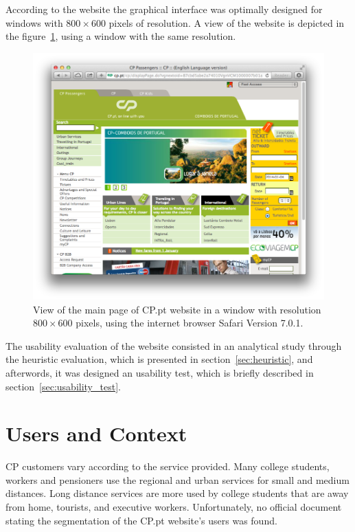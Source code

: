 \documentclass[a4paper]{article}
\begin{document}
According to the website the graphical interface was optimally designed for windows with $800\times 600$ pixels of resolution. A view of the website is depicted in the figure~\ref{fig:cp_home}, using a window with the same resolution. 

\begin{figure}[h] 
	\centering
	\includegraphics[width=\textwidth]{figures/cp_home}
 	\caption{View of the main page of CP.pt website in a window with resolution $800\times 600$ pixels, using the internet browser Safari Version 7.0.1.}\label{fig:cp_home}
\end{figure}

The usability evaluation of the website consisted in an analytical study through the heuristic evaluation, which is presented in section~\ref{sec:heuristic}, and afterwords, it was designed an usability test, which is briefly described in section~\ref{sec:usability_test}.

\section{Users and Context}
\label{sec:users_context}

CP customers vary according to the service provided. Many college students, workers and pensioners use the regional and urban services for small and medium distances. Long distance services are more used by college students that are away from home, tourists, and executive workers. Unfortunately, no official document stating the segmentation of the CP.pt website's users was found.
\end{document}
